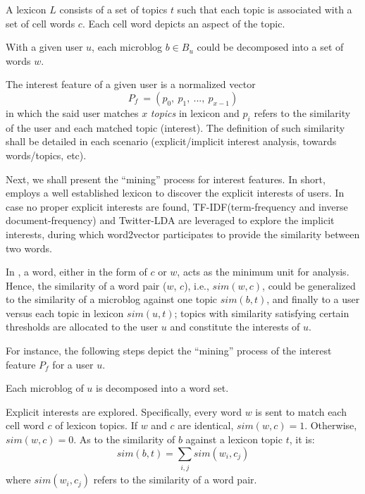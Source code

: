 \begin{definition}
\label{def:lexi}
A lexicon $L$ consists of a set of topics $t$ such that each topic is associated with a set of cell words $c$. Each cell word depicts an aspect of the topic.
\end{definition}

\begin{definition}
\label{def:bw}
With a given user $u$, each microblog $b \in B_u$ could be decomposed into a set of words $w$.
\end{definition}

\begin{definition}
\label{def:inte}
The interest feature of a given user is a normalized vector
\begin{equation}
\label{eq:inte}
P_f\ = (p_0,\ p_1,\ ...,\ p_{x-1})
\end{equation}
in which the said user matches $x$ \textit{topics} in lexicon and $p_i$ refers to the similarity of the user and each matched topic (interest). The definition of such similarity shall be detailed in each scenario (explicit/implicit interest analysis, towards words/topics, etc).
\end{definition}


Next, we shall present the ``mining'' process for interest features.
In short, \sys{} employs a well established lexicon to discover the explicit interests of users.
In case no proper explicit interests are found, TF-IDF(term-frequency and inverse document-frequency) and Twitter-LDA \cite{IEEEexample:zhao2011comparing} are leveraged to explore the implicit interests, during which word2vector participates to provide the similarity between two words.

In \sys{}, a word, either in the form of $c$ or $w$, acts as the minimum unit for analysis.
Hence, the similarity of a word pair ($w$, $c$), i.e., $sim(w, c)$, could be generalized to the similarity of a microblog against one topic $sim(b, t)$, and finally to a user versus each topic in lexicon $sim(u, t)$; topics with similarity satisfying certain thresholds are allocated to the user $u$ and constitute the interests of $u$.

For instance, the following steps depict the ``mining'' process of the interest feature $P_f$ for a user $u$.

 Each microblog of $u$ is decomposed into a word set. %

 Explicit interests are explored. Specifically, every word $w$ is sent to match each cell word $c$ of lexicon topics.
If $w$ and $c$ are identical, $sim(w, c) = 1$.
Otherwise, $sim(w, c) = 0$.
As to the similarity of $b$ against a lexicon topic $t$, it is:
\begin{equation}
\label{eq:bt}
sim(b, t) = \sum_{\substack{i, j}} sim(w_i, c_j)
\end{equation}
where $sim(w_i, c_j)$ refers to the similarity of a word pair.

